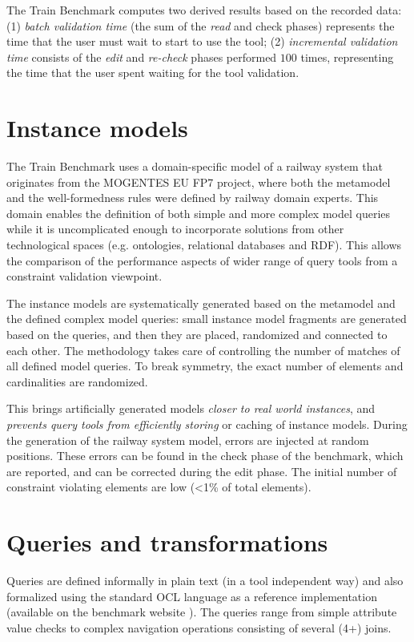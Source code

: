 The Train Benchmark computes two derived results based on the recorded data:
(1) \emph{batch validation time} (the sum of the \emph{read} and {check} phases)
represents the time that the user must wait to start to use the tool; (2)
\emph{incremental validation time} consists of the \emph{edit} and
\emph{re-check} phases performed $100$ times, representing the time that the
user spent waiting for the tool validation.


\section{Instance models}
The Train Benchmark uses a domain-specific model of a railway system that
originates from the MOGENTES EU FP7 project, where both the metamodel and the
well-formedness rules were defined by railway domain experts. This domain
enables the definition of both simple and more complex model queries while it is
uncomplicated enough to incorporate solutions from other technological spaces
(e.g. ontologies, relational databases and RDF). This allows the comparison of
the performance aspects of wider range of query tools from a constraint
validation viewpoint.

The instance models are systematically generated based on the metamodel and the
defined complex model queries: small instance model fragments are generated
based on the queries, and then they are placed, randomized and connected to each
other. The methodology takes care of controlling the number of matches of all
defined model queries. To break symmetry, the exact number of elements and
cardinalities are randomized.
 
This brings artificially generated models \emph{closer to real world instances},
and \emph{prevents query tools from efficiently storing} or caching of instance
models. During the generation of the railway system model, errors are injected
at random positions. These errors can be found in the check phase of the
benchmark, which are reported, and can be corrected during the edit phase. The
initial number of constraint violating elements are low (<1\% of total
elements).
 
\section{Queries and transformations}
Queries are defined informally in plain text (in a tool independent way) and
also formalized using the standard OCL language as a reference implementation
(available on the benchmark website \cite{TBwebsite}). The queries range from
simple attribute value checks to complex navigation operations consisting of
several (4+) joins.

